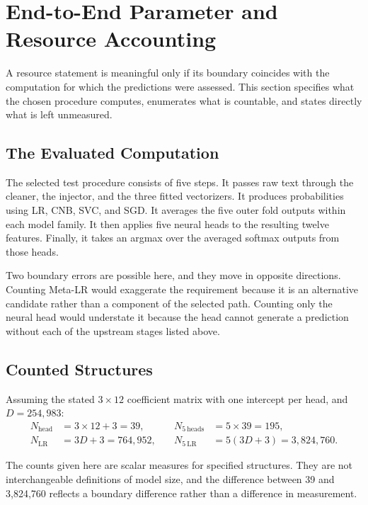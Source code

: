 \documentclass[runningheads]{llncs}
\begin{document}
\section{End-to-End Parameter and Resource Accounting}
\label{sec:accounting}

A resource statement is meaningful only if its boundary coincides with the computation for which the predictions were assessed. This section specifies what the chosen procedure computes, enumerates what is countable, and states directly what is left unmeasured.

\subsection{The Evaluated Computation}

The selected test procedure consists of five steps. It passes raw text through the cleaner, the injector, and the three fitted vectorizers. It produces probabilities using LR, CNB, SVC, and SGD. It averages the five outer fold outputs within each model family. It then applies five neural heads to the resulting twelve features. Finally, it takes an argmax over the averaged softmax outputs from those heads.

Two boundary errors are possible here, and they move in opposite directions. Counting Meta-LR would exaggerate the requirement because it is an alternative candidate rather than a component of the selected path. Counting only the neural head would understate it because the head cannot generate a prediction without each of the upstream stages listed above.

\subsection{Counted Structures}

Assuming the stated $3 \times 12$ coefficient matrix with one intercept per head, and $D = 254{,}983$:
\begin{equation}
\begin{aligned}
N_{\mathrm{head}} &= 3 \times 12 + 3 = 39, &\quad N_{\mathrm{5\ heads}} &= 5 \times 39 = 195,\\
N_{\mathrm{LR}} &= 3D + 3 = 764{,}952, &\quad N_{\mathrm{5\ LR}} &= 5(3D + 3) = 3{,}824{,}760.
\end{aligned}
\label{eq:counts}
\end{equation}

The counts given here are scalar measures for specified structures. They are not interchangeable definitions of model size, and the difference between 39 and 3,824,760 reflects a boundary difference rather than a difference in measurement.
\end{document}
